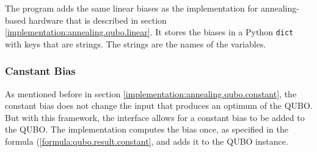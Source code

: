 The program adds the same linear biases as the implementation for annealing-based hardware that is described in section \ref{implementation:annealing.qubo.linear}.
It stores the biases in a Python \texttt{dict} with keys that are strings.
The strings are the names of the variables.

\subsubsection{Canstant Bias}

As mentioned before in section \ref{implementation:annealing.qubo.constant}, the constant bias does not change the input that produces an optimum of the QUBO.
But with this framework, the interface allows for a constant bias to be added to the QUBO.
The implementation computes the bias once, as specified in the formula (\ref{formula:qubo.result.constant}, and adds it to the QUBO instance.
